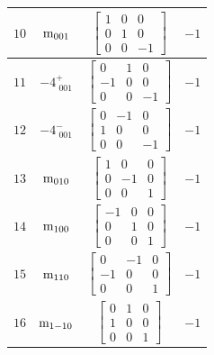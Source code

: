 \documentclass[fleqn,8pt]{jsarticle}
\begin{document}
\begin{longtable}{cccc}
$ 10 $ & $ {\rm m}_{001} $ & $ \begin{bmatrix} 1 & 0 & 0 \\ 0 & 1 & 0 \\ 0 & 0 & -1 \end{bmatrix} $ & $ -1 $ \\ \hline
$ 11 $ & $ -4^{+}_{\,\,001} $ & $ \begin{bmatrix} 0 & 1 & 0 \\ -1 & 0 & 0 \\ 0 & 0 & -1 \end{bmatrix} $ & $ -1 $ \\ \hline
$ 12 $ & $ -4^{-}_{\,\,001} $ & $ \begin{bmatrix} 0 & -1 & 0 \\ 1 & 0 & 0 \\ 0 & 0 & -1 \end{bmatrix} $ & $ -1 $ \\ \hline
$ 13 $ & $ {\rm m}_{010} $ & $ \begin{bmatrix} 1 & 0 & 0 \\ 0 & -1 & 0 \\ 0 & 0 & 1 \end{bmatrix} $ & $ -1 $ \\ \hline
$ 14 $ & $ {\rm m}_{100} $ & $ \begin{bmatrix} -1 & 0 & 0 \\ 0 & 1 & 0 \\ 0 & 0 & 1 \end{bmatrix} $ & $ -1 $ \\ \hline
$ 15 $ & $ {\rm m}_{110} $ & $ \begin{bmatrix} 0 & -1 & 0 \\ -1 & 0 & 0 \\ 0 & 0 & 1 \end{bmatrix} $ & $ -1 $ \\ \hline
$ 16 $ & $ {\rm m}_{1-10} $ & $ \begin{bmatrix} 0 & 1 & 0 \\ 1 & 0 & 0 \\ 0 & 0 & 1 \end{bmatrix} $ & $ -1 $ \\
\end{longtable}
\end{document}
